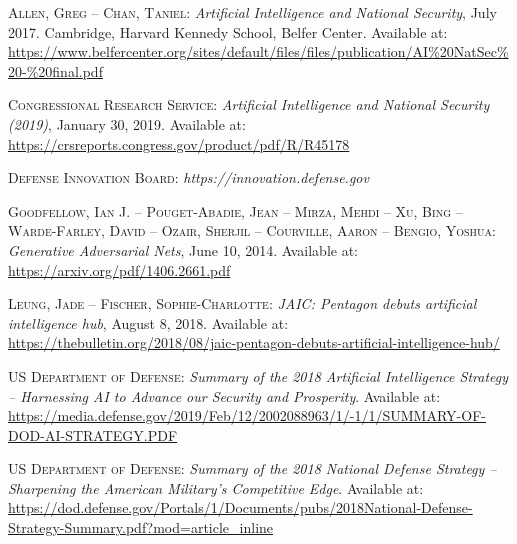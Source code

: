 \documentclass[
]{thesis-ekf}
\theoremstyle{definition}
\theoremstyle{remark}
\begin{document}
\begin{thebibliography}{7}
	
	\textsc{Allen, Greg – Chan, Taniel}: \emph{Artificial Intelligence and National Security}, July 2017. Cambridge, Harvard Kennedy School, Belfer Center. Available at: \url{https://www.belfercenter.org/sites/default/files/files/publication/AI%20NatSec%20-%20final.pdf}
	
	\textsc{Congressional Research Service}: \emph{Artificial Intelligence and National Security (2019)}, January 30, 2019. Available at: \url{https://crsreports.congress.gov/product/pdf/R/R45178}
	
	\textsc{Defense Innovation Board}: \emph{https://innovation.defense.gov}
	
	\textsc{Goodfellow, Ian J. – Pouget-Abadie, Jean – Mirza, Mehdi – Xu, Bing – Warde-Farley, David – Ozair, Sherjil – Courville, Aaron – Bengio, Yoshua}: \emph{Generative Adversarial Nets}, June 10, 2014. Available at: \url{https://arxiv.org/pdf/1406.2661.pdf}
	
	\textsc{Leung, Jade – Fischer, Sophie-Charlotte}: \emph{JAIC: Pentagon debuts artificial intelligence hub}, August 8, 2018. Available at: \url{https://thebulletin.org/2018/08/jaic-pentagon-debuts-artificial-intelligence-hub/}
	
	\textsc{US Department of Defense}: \emph{Summary of the 2018 Artificial Intelligence Strategy – Harnessing AI to Advance our Security and Prosperity}. Available at: \url{https://media.defense.gov/2019/Feb/12/2002088963/1/-1/1/SUMMARY-OF-DOD-AI-STRATEGY.PDF}
	
	\textsc{US Department of Defense}: \emph{Summary of the 2018 National Defense Strategy – Sharpening the American Military’s Competitive Edge}. Available at: \url{https://dod.defense.gov/Portals/1/Documents/pubs/2018National-Defense-Strategy-Summary.pdf?mod=article_inline}
	
\end{thebibliography}


\end{document}
